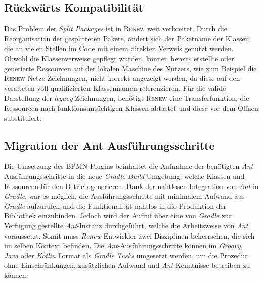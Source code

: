  \subsection*{Rückwärts Kompatibilität}
	Das Problem der \textit{Split Packages} ist in \textsc{Renew} weit verbreitet. Durch die Reorganisation der gesplitteten Pakete, ändert sich der Paketname der Klassen, die an vielen Stellen im Code mit einem direkten Verweis genutzt werden. Obwohl die Klassenverweise gepflegt wurden, können bereits erstellte oder generierte Ressourcen auf der lokalen Maschine des Nutzers, wie zum Beispiel die \textsc{Renew} Netze Zeichnungen, nicht korrekt angezeigt werden, da diese auf den veralteten voll-qualifizierten Klassennamen referenzieren.\newline
	Für die valide Darstellung der \textit{legacy} Zeichnungen, benötigt \textsc{Renew} eine Transferfunktion, die Ressourcen nach funktionsuntüchtigen Klassen abtastet und diese vor dem Öffnen substituiert.
	
 \subsection*{Migration der Ant Ausführungsschritte}
	Die Umsetzung des BPMN Plugins beinhaltet die Aufnahme der benötigten \textit{Ant}-Ausführungsschritte in die neue \textit{Gradle-Build}-Umgebung, welche Klassen und Ressourcen für den Betrieb generieren. Dank der nahtlosen Integration von \textit{Ant} in \textit{Gradle}, war es möglich, die Ausführungsschritte mit minimalem Aufwand aus \textit{Gradle} aufzurufen und die Funktionalität nahtlos in die Produktion der Bibliothek einzubinden. Jedoch wird der Aufruf über eine von \textit{Gradle} zur Verfügung gestellte \textit{Ant}-Instanz durchgeführt, welche die Arbeitsweise von \textit{Ant} voraussetzt. Somit muss \textit{Renew} Entwickler zwei Disziplinen beherrschen, die sich im selben Kontext befinden.\newline
	Die \textit{Ant}-Ausführungsschritte können im \textit{Groovy}, \textit{Java} oder \textit{Kotlin} Format als \textit{Gradle Tasks} umgesetzt werden, um die Prozedur ohne Einschränkungen, zusätzlichen Aufwand und \textit{Ant} Kenntnisse betreiben zu können. 
	
